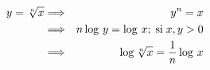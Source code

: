\documentclass{article} %
\begin{document}
\begin{eqnarray}
y=\sqrt[n]{x} &\Longrightarrow &y^n=x \\
&\Longrightarrow &n\log\,y=\log\,x;\;\mbox{si}\; x,y>0\\
&\Longrightarrow &\log \sqrt[n]{x}={1 \over n}\log \,x
\end{eqnarray}
\end{document}
